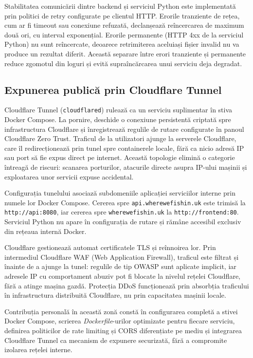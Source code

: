 Stabilitatea comunicării dintre backend și serviciul Python este implementată prin politici de retry configurate pe clientul HTTP. Erorile tranziente de rețea, cum ar fi timeout sau conexiune refuzată, declanșează reîncercarea de maximum două ori, cu interval exponențial. Erorile permanente (HTTP 4xx de la serviciul Python) nu sunt reîncercate, deoarece retrimiterea aceluiași fișier invalid nu va produce un rezultat diferit. Această separare între erori tranziente și permanente reduce zgomotul din loguri și evită supraîncărcarea unui serviciu deja degradat.

\subsection{Expunerea publică prin Cloudflare Tunnel}

Cloudflare Tunnel (\texttt{cloudflared}) \citep{cloudflare-tunnel} rulează ca un serviciu suplimentar în stiva Docker Compose. La pornire, deschide o conexiune persistentă criptată spre infrastructura Cloudflare și înregistrează regulile de rutare configurate în panoul Cloudflare Zero Trust. Traficul de la utilizatori ajunge la serverele Cloudflare, care îl redirecționează prin tunel spre containerele locale, fără ca nicio adresă IP sau port să fie expus direct pe internet. Această topologie elimină o categorie întreagă de riscuri: scanarea porturilor, atacurile directe asupra IP-ului mașinii și exploatarea unor servicii expuse accidental.

Configurația tunelului asociază subdomeniile aplicației serviciilor interne prin numele lor Docker Compose. Cererea spre \texttt{api.wherewefishin.uk} este trimisă la \texttt{http://api:8080}, iar cererea spre \texttt{wherewefishin.uk} la \texttt{http://frontend:80}. Serviciul Python nu apare în configurația de rutare și rămâne accesibil exclusiv din rețeaua internă Docker.

Cloudflare gestionează automat certificatele TLS și reînnoirea lor. Prin intermediul Cloudflare WAF (Web Application Firewall), traficul este filtrat și înainte de a ajunge la tunel: regulile de tip OWASP sunt aplicate implicit, iar adresele IP cu comportament abuziv pot fi blocate la nivelul rețelei Cloudflare, fără a atinge mașina gazdă. Protecția DDoS funcționează prin absorbția traficului în infrastructura distribuită Cloudflare, nu prin capacitatea mașinii locale.

Contribuția personală în această zonă constă în configurarea completă a stivei Docker Compose, scrierea \emph{Dockerfile}-urilor optimizate pentru fiecare serviciu, definirea politicilor de rate limiting și CORS diferențiate pe mediu și integrarea Cloudflare Tunnel ca mecanism de expunere securizată, fără a compromite izolarea rețelei interne.


